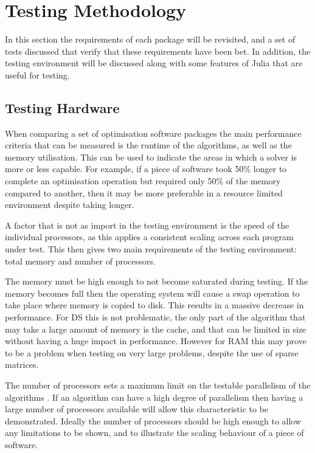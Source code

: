 \section{Testing Methodology}\label{sec:testing}

In this section the requirements of each package will be revisited, and a set of tests discussed that verify that these requirements have been bet. In addition, the testing environment will be discussed along with some features of Julia that are useful for testing.

\subsection{Testing Hardware}

When comparing a set of optimisation software packages the main performance criteria that can be measured is the runtime of the algorithms, as well as the memory utilisation. This can be used to indicate the areas in which a solver is more or less capable. For example, if a piece of software took 50\% longer to complete an optimisation operation but required only 50\% of the memory compared to another, then it may be more preferable in a resource limited environment despite taking longer.

A factor that is not as import in the testing environment is the speed of the individual processors, as this applies a consistent scaling across each program under test. This then gives two main requirements of the testing environment: total memory and number of processors. 

The memory must be high enough to not become saturated during testing. If the memory becomes full then the operating system will cause a swap operation to take place where memory is copied to disk. This results in a massive decrease in performance. For DS this is not problematic, the only part of the algorithm that may take a large amount of memory is the cache, and that can be limited in size without having a huge impact in performance. However for RAM this may prove to be a problem when testing on very large problems, despite the use of sparse matrices.

The number of processors sets a maximum limit on the testable parallelism of the algorithms . If an algorithm can have a high degree of parallelism then having a large number of processors available will allow this characteristic to be demonstrated. Ideally the number of processors should be high enough to allow any limitations to be shown, and to illustrate the scaling behaviour of a piece of software. 

